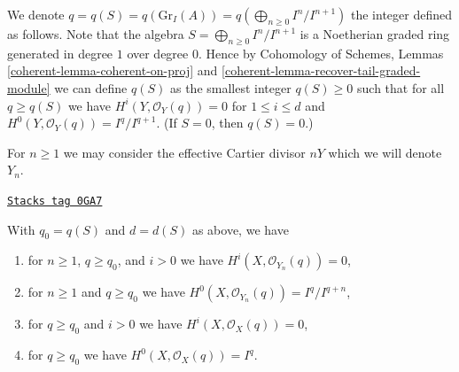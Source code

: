 \medskip\noindent
We denote
$q = q(S) = q(\text{Gr}_I(A)) = q(\bigoplus_{n \geq 0} I^n/I^{n + 1})$
the integer defined as follows. Note that the algebra
$S = \bigoplus_{n \geq 0} I^n/I^{n + 1}$
is a Noetherian graded ring generated in degree $1$ over degree $0$.
Hence by
Cohomology of Schemes, Lemmas \ref{coherent-lemma-coherent-on-proj} and
\ref{coherent-lemma-recover-tail-graded-module} we can define $q(S)$
as the smallest integer $q(S) \geq 0$ such that for all $q \geq q(S)$ we have
$H^i(Y, \mathcal{O}_Y(q)) = 0$ for $1 \leq i \leq d$ and
$H^0(Y, \mathcal{O}_Y(q)) = I^q/I^{q + 1}$.
(If $S = 0$, then $q(S) = 0$.)

\medskip\noindent
For $n \geq 1$ we may consider the effective Cartier divisor $nY$
which we will denote $Y_n$.

\begin{lemma}
\label{local-cohomology-lemma-bound-q-and-d}
\href{https://stacks.math.columbia.edu/tag/0GA7}{\texttt{Stacks tag 0GA7}}

With $q_0 = q(S)$ and $d = d(S)$ as above, we have
\begin{enumerate}
\item for $n \geq 1$, $q \geq q_0$, and $i > 0$ we have
$H^i(X, \mathcal{O}_{Y_n}(q)) = 0$,
\item for $n \geq 1$ and $q \geq q_0$ we have
$H^0(X, \mathcal{O}_{Y_n}(q)) = I^q/I^{q + n}$,
\item for $q \geq q_0$ and $i > 0$ we have
$H^i(X, \mathcal{O}_X(q)) = 0$,
\item for $q \geq q_0$ we have
$H^0(X, \mathcal{O}_X(q)) = I^q$.
\end{enumerate}
\end{lemma}

